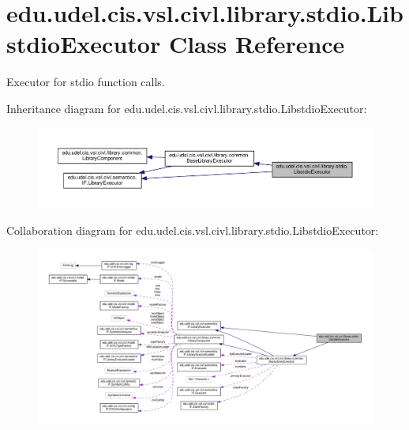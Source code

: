 \hypertarget{classedu_1_1udel_1_1cis_1_1vsl_1_1civl_1_1library_1_1stdio_1_1LibstdioExecutor}{}\section{edu.\+udel.\+cis.\+vsl.\+civl.\+library.\+stdio.\+Libstdio\+Executor Class Reference}
\label{classedu_1_1udel_1_1cis_1_1vsl_1_1civl_1_1library_1_1stdio_1_1LibstdioExecutor}


Executor for stdio function calls.  




Inheritance diagram for edu.\+udel.\+cis.\+vsl.\+civl.\+library.\+stdio.\+Libstdio\+Executor\+:
\nopagebreak
\begin{figure}[H]
\begin{center}
\leavevmode
\includegraphics[width=350pt]{classedu_1_1udel_1_1cis_1_1vsl_1_1civl_1_1library_1_1stdio_1_1LibstdioExecutor__inherit__graph}
\end{center}
\end{figure}


Collaboration diagram for edu.\+udel.\+cis.\+vsl.\+civl.\+library.\+stdio.\+Libstdio\+Executor\+:
\nopagebreak
\begin{figure}[H]
\begin{center}
\leavevmode
\includegraphics[width=350pt]{classedu_1_1udel_1_1cis_1_1vsl_1_1civl_1_1library_1_1stdio_1_1LibstdioExecutor__coll__graph}
\end{center}
\end{figure}
